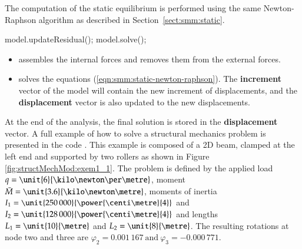 The computation of the static equilibrium is performed using the same
Newton-Raphson algorithm as described in
Section~\ref{sect:smm:static}.


\begin{cpp}
  model.updateResidual();
  model.solve();
\end{cpp}

\begin{itemize}
\item {} assembles the  internal forces and removes them
  from the external forces.
\item        {}         solves        the        equations
  (\ref{eqn:smm:static-newton-raphson}).   The \textbf{increment} vector  of the
  model   will   contain  the   new   increment   of   displacements,  and   the
  \textbf{displacement} vector is also updated to the new displacements.
\end{itemize}

At   the  end   of  the   analysis, the   final  solution   is  stored   in  the
\textbf{displacement}  vector.  A  full example  of  how to  solve a  structural
mechanics       problem        is       presented       in        the       code
.  This  example is composed  of a 2D
beam, clamped at  the left end and  supported by two rollers as  shown in Figure
\ref{fig:structMechMod:exem1_1}.  The problem  is  defined by  the applied  load
$q=\unit{6}{\kilo\newton\per\metre}$,          moment         $\bar{M}         =
\unit{3.6}{\kilo\newton\metre}$,      moments     of     inertia      $I_1     =
\unit{250\,000}{\power{\centi\metre}{4}}$           and          $I_2          =
\unit{128\,000}{\power{\centi\metre}{4}}$ and  lengths $L_1 = \unit{10}{\metre}$
and $L_2 = \unit{8}{\metre}$.  The resulting rotations at node two and three are
$ \varphi_2 = 0.001\,167\ \mbox{and}\ \varphi_3 = -0.000\,771.$


